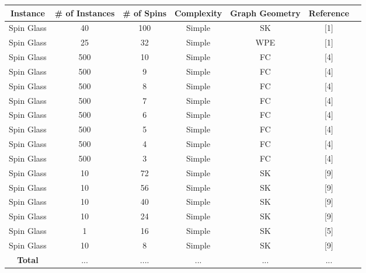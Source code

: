 \documentclass{standalone}
\begin{document}
\begin{tabular}{ |c|c|c|c|c|c|c| } 
    \hline
    \textbf{Instance} & \textbf{\# of Instances} & \textbf{\# of Spins} & \textbf{Complexity} & \textbf{Graph Geometry} & \textbf{Reference}\\ 
    \hline
    Spin Glass & 40 & 100 & Simple & SK & [1] \\
    Spin Glass & 25 & 32 & Simple & WPE & [1] \\
    Spin Glass & 500 & 10 & Simple & FC & [4] \\
    Spin Glass & 500 & 9 & Simple & FC & [4] \\
    Spin Glass & 500 & 8 & Simple & FC & [4] \\
    Spin Glass & 500 & 7 & Simple & FC & [4] \\
    Spin Glass & 500 & 6 & Simple & FC & [4] \\
    Spin Glass & 500 & 5 & Simple & FC & [4] \\
    Spin Glass & 500 & 4 & Simple & FC & [4] \\
    Spin Glass & 500 & 3 & Simple & FC & [4] \\
    Spin Glass & 10 & 72 & Simple & SK & [9] \\
    Spin Glass & 10 & 56 & Simple & SK & [9] \\
    Spin Glass & 10 & 40 & Simple & SK & [9] \\
    Spin Glass & 10 & 24 & Simple & SK & [9] \\
    Spin Glass & 1 & 16 & Simple & SK & [5] \\
    Spin Glass & 10 & 8 & Simple & SK & [9] \\
    \hline
    \textbf{Total} & ... & .... & ... & ... & ... \\
    \hline
\end{tabular}
\end{document}
